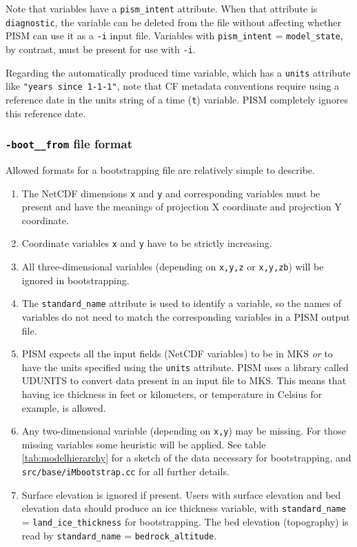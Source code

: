 \documentclass[11pt,final]{amsart}
\newcommand{\und}{\_\!\_}
\begin{document}
Note that variables have a \verb|pism_intent|\index{PISM!\texttt{pism\und intent} attribute} attribute.  When that attribute is \verb|diagnostic|, the variable can be deleted from the file without affecting whether PISM can use it as a \verb|-i| input file.  Variables with \verb|pism_intent| = \verb|model_state|, by contrast, must be present for use with \verb|-i|.

Regarding the automatically produced time variable, which has a \verb|units| attribute like \verb|"years since 1-1-1"|, note that CF metadata conventions require using a reference date in the units string of a time (\verb|t|) variable.  PISM completely ignores this reference date.


\subsubsection*{\texttt{-boot\und from} file format}
\label{sec:bootstrapping-format}  Allowed formats for a bootstrapping file are relatively simple to describe. 
\begin{enumerate}
\item The NetCDF dimensions \verb|x| and \verb|y| and corresponding variables must be present and have the meanings of projection X coordinate and projection Y coordinate.
\item Coordinate variables \verb|x| and \verb|y| have to be strictly increasing.
\item All three-dimensional variables (depending on \verb|x,y,z| or \verb|x,y,zb|) will be ignored in bootstrapping.
\item The \verb|standard_name| attribute is used to identify a variable, so the names of variables do not need to match the corresponding variables in a PISM output file.
\item PISM expects all the input fields (NetCDF variables) to be in MKS \emph{or} to have the units specified using the \verb|units| attribute.  PISM uses a library called UDUNITS to convert data present in an input file to MKS.   This means that having ice thickness in feet or kilometers, or temperature in Celsius for example, is allowed.
\item Any two-dimensional variable (depending on \verb|x,y|) may be missing.  For those missing variables some heuristic will be applied.  See table \ref{tab:modelhierarchy} for a sketch of the data necessary for bootstrapping, and \verb|src/base/iMbootstrap.cc| for all further details.
\item Surface elevation is ignored if present.  Users with surface elevation and bed elevation data should produce an ice thickness variable, with \verb|standard_name| = \verb|land_ice_thickness| for bootstrapping.  The bed elevation (topography) is read by \verb|standard_name| = \verb|bedrock_altitude|.
\end{enumerate}
\end{document}
